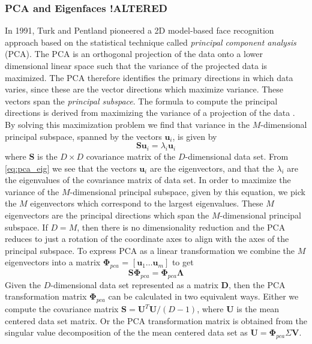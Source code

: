\documentclass[11pt,a4paper]{report}
\begin{document}
\subsubsection{PCA and Eigenfaces !ALTERED}
In 1991, Turk and Pentland \cite{eigenfaces91} pioneered a 2D model-based face recognition approach
based on the statistical
technique called \textit{principal component analysis} (PCA). The PCA is an orthogonal
projection of the data onto a lower dimensional linear space such that the
variance of the projected data is maximized. The PCA therefore
identifies the primary directions in which data varies, since these are the
vector directions which maximize variance. These vectors span
the \textit{principal subspace}. The formula to compute the principal directions
is derived from maximizing the variance of a projection of the data
\cite{bishop}. By solving this maximization problem we find that variance in the
$M$-dimensional principal subspace, spanned by the vectors $\mathbf{u}_i$, is given by
\begin{equation}\label{eq:pca_eig}
\mathbf{S}\mathbf{u}_i = \lambda_i \mathbf{u}_i
\end{equation}
where $\mathbf{S}$ is the $D \times D$ covariance matrix of the $D$-dimensional
data set. From \ref{eq:pca_eig} we see that the vectors $\mathbf{u}_i$ are the
eigenvectors, and that the $\lambda_i$ are the eigenvalues of the covariance matrix of
data set. In order to maximize the variance of the $M$-dimensional principal subspace, given by
this equation, we pick the $M$ eigenvectors which correspond to the largest
eigenvalues. These $M$ eigenvectors are the principal directions which span the
$M$-dimensional principal subspace. If $D = M$, then there is no
dimensionality reduction and the PCA reduces to just a rotation
of the coordinate axes to align with the axes of the principal subspace.  
To express PCA as a linear transformation we combine the $M$ eigenvectors into a
matrix $\mathbf{\Phi}_{pca}$ = $[\mathbf{u}_1 \ldots \mathbf{u}_m]$ to get
\begin{equation}\label{eq:pca}
\mathbf{S}\mathbf{\Phi}_{pca} = \mathbf{\Phi}_{pca}\mathbf{\Lambda}
\end{equation}
Given the $D$-dimensional data set represented as a matrix $\mathbf{D}$, then the PCA transformation matrix $\mathbf{\Phi}_{pca}$ can be calculated in two
equivalent ways. Either we compute the covariance matrix $\mathbf{S} =
\mathbf{U}^T\mathbf{U} / (D-1)$, where $\mathbf{U}$ is the mean centered data set
matrix. Or the PCA transformation matrix is obtained from the singular value
decomposition of the the mean centered data set as
$\mathbf{U} = \mathbf{\Phi}_{pca}\Sigma\mathbf{V}$. 
\end{document}
